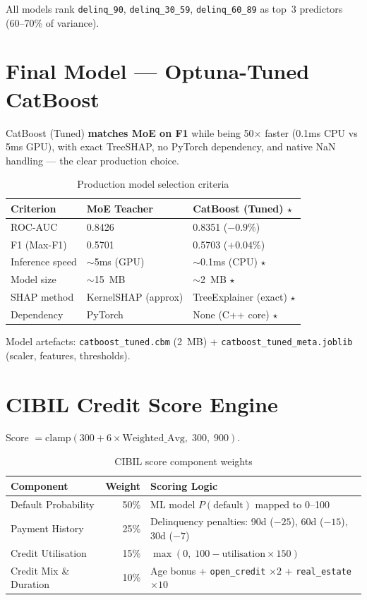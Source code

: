 \documentclass[11pt,a4paper]{article}
\begin{document}
All models rank \texttt{delinq\_90}, \texttt{delinq\_30\_59}, \texttt{delinq\_60\_89} as top~3 predictors (60--70\% of variance).


\section{Final Model --- Optuna-Tuned CatBoost}

CatBoost (Tuned) \textbf{matches MoE on F1} while being 50$\times$ faster (0.1ms CPU vs 5ms GPU), with exact TreeSHAP, no PyTorch dependency, and native NaN handling --- the clear production choice.

\begin{table}[H]
\centering\small
\caption{Production model selection criteria}
\begin{tabular}{@{}lll@{}}
\toprule
\textbf{Criterion} & \textbf{MoE Teacher} & \textbf{CatBoost (Tuned) $\star$} \\
\midrule
ROC-AUC & 0.8426 & 0.8351 ($-0.9\%$) \\
F1 (Max-F1) & 0.5701 & 0.5703 ($+0.04\%$) \\
Inference speed & $\sim$5ms (GPU) & $\sim$0.1ms (CPU) $\star$ \\
Model size & $\sim$15~MB & $\sim$2~MB $\star$ \\
SHAP method & KernelSHAP (approx) & TreeExplainer (exact) $\star$ \\
Dependency & PyTorch & None (C++ core) $\star$ \\
\bottomrule
\end{tabular}
\end{table}

Model artefacts: \texttt{catboost\_tuned.cbm} (2~MB) + \texttt{catboost\_tuned\_meta.joblib} (scaler, features, thresholds).


\section{CIBIL Credit Score Engine}

Score $= \text{clamp}(300 + 6 \times \text{Weighted\_Avg},\; 300,\; 900)$.

\begin{table}[H]
\centering\small
\caption{CIBIL score component weights}
\begin{tabular}{@{}lrl@{}}
\toprule
\textbf{Component} & \textbf{Weight} & \textbf{Scoring Logic} \\
\midrule
Default Probability & 50\% & ML model $P(\text{default})$ mapped to 0--100 \\
Payment History & 25\% & Delinquency penalties: 90d ($-25$), 60d ($-15$), 30d ($-7$) \\
Credit Utilisation & 15\% & $\max(0,\; 100 - \text{utilisation} \times 150)$ \\
Credit Mix \& Duration & 10\% & Age bonus + \texttt{open\_credit} $\times 2$ + \texttt{real\_estate} $\times 10$ \\
\bottomrule
\end{tabular}
\end{table}
\end{document}
